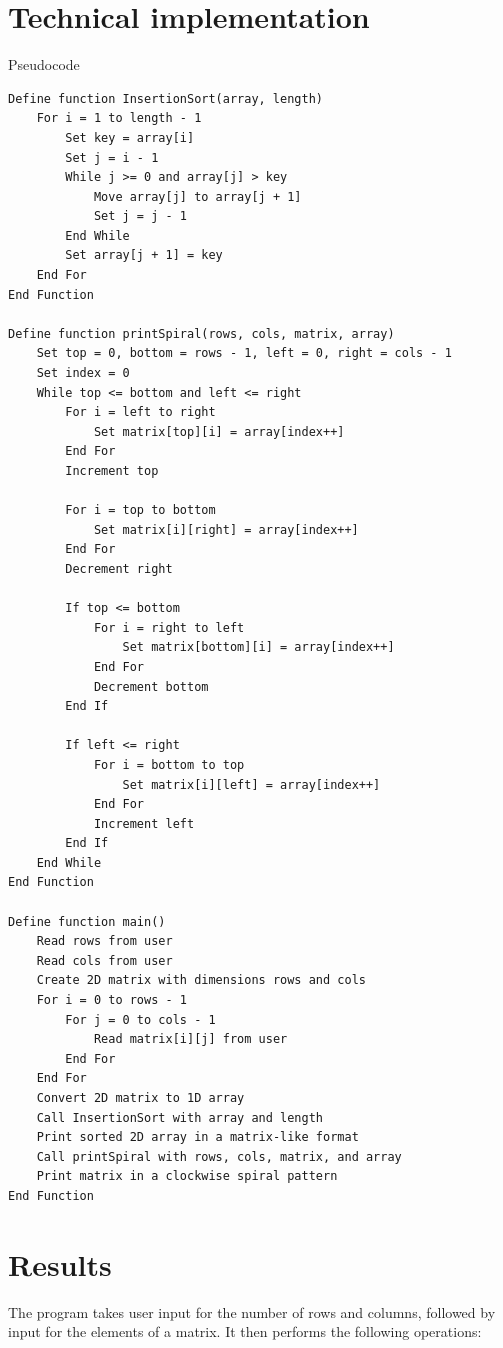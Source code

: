 \documentclass[12pt]{article}
\begin{document}
\section*{Technical implementation}
Pseudocode
\begin{lstlisting}
Define function InsertionSort(array, length)
    For i = 1 to length - 1
        Set key = array[i]
        Set j = i - 1
        While j >= 0 and array[j] > key
            Move array[j] to array[j + 1]
            Set j = j - 1
        End While
        Set array[j + 1] = key
    End For
End Function

Define function printSpiral(rows, cols, matrix, array)
    Set top = 0, bottom = rows - 1, left = 0, right = cols - 1
    Set index = 0
    While top <= bottom and left <= right
        For i = left to right
            Set matrix[top][i] = array[index++]
        End For
        Increment top

        For i = top to bottom
            Set matrix[i][right] = array[index++]
        End For
        Decrement right

        If top <= bottom
            For i = right to left
                Set matrix[bottom][i] = array[index++]
            End For
            Decrement bottom
        End If
        
        If left <= right
            For i = bottom to top
                Set matrix[i][left] = array[index++]
            End For
            Increment left
        End If
    End While
End Function

Define function main()
    Read rows from user
    Read cols from user
    Create 2D matrix with dimensions rows and cols
    For i = 0 to rows - 1
        For j = 0 to cols - 1
            Read matrix[i][j] from user
        End For
    End For
    Convert 2D matrix to 1D array
    Call InsertionSort with array and length
    Print sorted 2D array in a matrix-like format
    Call printSpiral with rows, cols, matrix, and array
    Print matrix in a clockwise spiral pattern
End Function

\end{lstlisting}

\section*{Results}
\hspace{0.8cm} The program takes user input for the number of rows and columns, followed by input for the elements of a matrix. It then performs the following operations:
\end{document}
